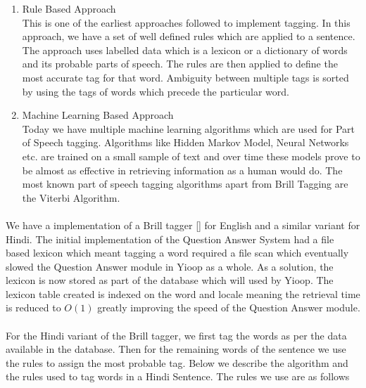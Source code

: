 \begin{enumerate}
\item Rule Based Approach \\
This is one of the earliest approaches followed to implement tagging. In this approach, we have a set of well defined rules which are applied to a sentence. The approach uses labelled data which is a lexicon or a dictionary of words and its probable parts of speech. 
The rules are then applied to define the most accurate tag for that word. Ambiguity between multiple tags is sorted by using the tags of words which precede the particular word.
	
\item Machine Learning Based Approach \\
Today we have multiple machine learning algorithms which are used for Part of Speech tagging. Algorithms like Hidden Markov Model, Neural Networks etc. are trained on a small sample of text and over time these models prove to be almost as effective in retrieving information as a human would do. The most known part of speech tagging algorithms apart from Brill Tagging are the Viterbi Algorithm.
\end{enumerate}

\paragraph{}
We have a implementation of a Brill tagger [] for English and a similar variant for Hindi.  The initial implementation of the Question Answer System had a file based lexicon which meant tagging a word required a file scan which eventually  slowed the Question Answer module in Yioop as a whole. As a solution, the lexicon is now stored as part of the database which will used by Yioop. The lexicon table created is indexed on the word and locale meaning the retrieval time is reduced to $O(1)$ greatly improving the speed of the Question Answer module. 

\paragraph{}
For the Hindi variant of the Brill tagger, we first tag the words as per the data available in the database. Then for the remaining words of the sentence we use the rules to assign the most probable tag. Below we describe the algorithm and the rules used to tag words in a Hindi Sentence. The rules we use are as follows \\


